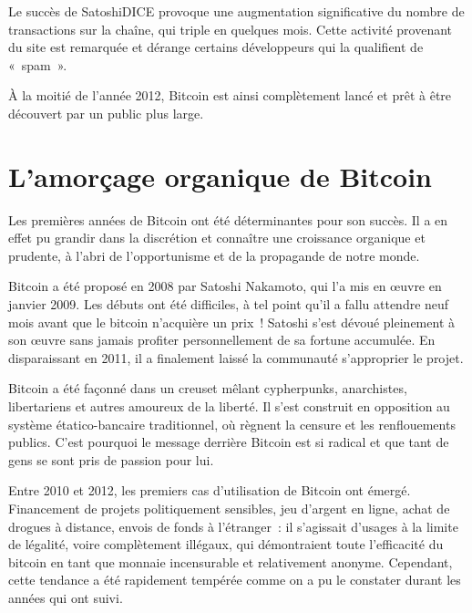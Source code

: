 Le succès de SatoshiDICE provoque une augmentation significative du nombre de transactions sur la chaîne, qui triple en quelques mois. Cette activité provenant du site est remarquée et dérange certains développeurs qui la qualifient de «~spam~».

À la moitié de l'année 2012, Bitcoin est ainsi complètement lancé et prêt à être découvert par un public plus large.

\section*{L'amorçage organique de Bitcoin}

Les premières années de Bitcoin ont été déterminantes pour son succès. Il a en effet pu grandir dans la discrétion et connaître une croissance organique et prudente, à l'abri de l'opportunisme et de la propagande de notre monde.

Bitcoin a été proposé en 2008 par Satoshi Nakamoto, qui l'a mis en œuvre en janvier 2009. Les débuts ont été difficiles, à tel point qu'il a fallu attendre neuf mois avant que le bitcoin n'acquière un prix~! Satoshi s'est dévoué pleinement à son œuvre sans jamais profiter personnellement de sa fortune accumulée. En disparaissant en 2011, il a finalement laissé la communauté s'approprier le projet.

Bitcoin a été façonné dans un creuset mêlant cypherpunks, anarchistes, libertariens et autres amoureux de la liberté. Il s'est construit en opposition au système étatico-bancaire traditionnel, où règnent la censure et les renflouements publics. C'est pourquoi le message derrière Bitcoin est si radical et que tant de gens se sont pris de passion pour lui.

Entre 2010 et 2012, les premiers cas d'utilisation de Bitcoin ont émergé. Financement de projets politiquement sensibles, jeu d'argent en ligne, achat de drogues à distance, envois de fonds à l'étranger~: il s'agissait d'usages à la limite de légalité, voire complètement illégaux, qui démontraient toute l'efficacité du bitcoin en tant que monnaie incensurable et relativement anonyme. Cependant, cette tendance a été rapidement tempérée comme on a pu le constater durant les années qui ont suivi.